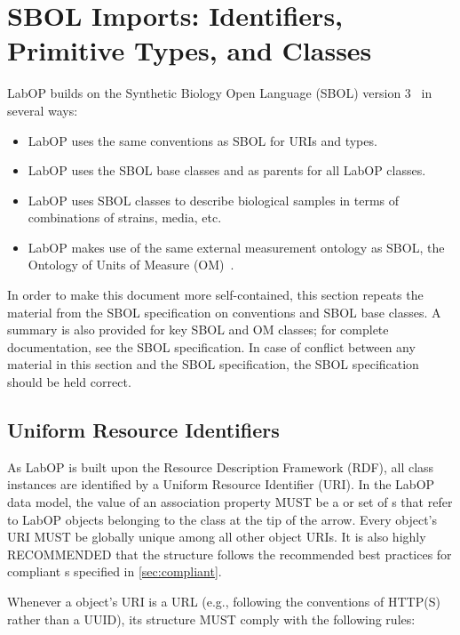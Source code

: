 \section{SBOL Imports: Identifiers, Primitive Types, and Classes}

LabOP builds on the Synthetic Biology Open Language (SBOL) version 3~\citep{SBOL3} in several ways:
\begin{itemize}
\item LabOP uses the same conventions as SBOL for URIs and types.
\item LabOP uses the SBOL base classes  and  as parents for all LabOP classes.
\item LabOP uses SBOL classes to describe biological samples in terms of combinations of strains, media, etc.
\item LabOP makes use of the same external measurement ontology as SBOL, the Ontology of Units of Measure (OM)~\citep{om2}.
\end{itemize}

In order to make this document more self-contained, this section repeats the material from the SBOL specification on conventions and SBOL base classes.
A summary is also provided for key SBOL and OM classes; for complete documentation, see the SBOL specification.
In case of conflict between any material in this section and the SBOL specification, the SBOL specification should be held correct.

\subsection{Uniform Resource Identifiers}
\label{sec:URIstructure}

As LabOP is built upon the Resource Description Framework (RDF), all class instances are identified by a Uniform Resource Identifier (URI).  In the LabOP data model, the value of an association property MUST be a  or set of s that refer to LabOP objects belonging to the class at the tip of the arrow.  Every  object's URI MUST be globally unique among all other  object URIs. It is also highly RECOMMENDED that the  structure follows the recommended best practices for compliant s specified in \ref{sec:compliant}.

Whenever a  object's URI is a URL (e.g., following the conventions of HTTP(S) rather than a UUID), its structure MUST comply with the following rules:

